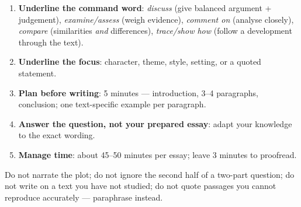 \documentclass[11pt]{article}
\begin{document}
\begin{methode}
\begin{enumerate}
\item \textbf{Underline the command word}: \emph{discuss} (give balanced argument + judgement), \emph{examine/assess} (weigh evidence), \emph{comment on} (analyse closely), \emph{compare} (similarities \emph{and} differences), \emph{trace/show how} (follow a development through the text).
\item \textbf{Underline the focus}: character, theme, style, setting, or a quoted statement.
\item \textbf{Plan before writing}: 5 minutes — introduction, 3--4 paragraphs, conclusion; one text-specific example per paragraph.
\item \textbf{Answer the question, not your prepared essay}: adapt your knowledge to the exact wording.
\item \textbf{Manage time}: about 45--50 minutes per essay; leave 3 minutes to proofread.
\end{enumerate}
\end{methode}

\begin{attention}
Do not narrate the plot; do not ignore the second half of a two-part question; do not write on a text you have not studied; do not quote passages you cannot reproduce accurately — paraphrase instead.
\end{attention}
\end{document}
